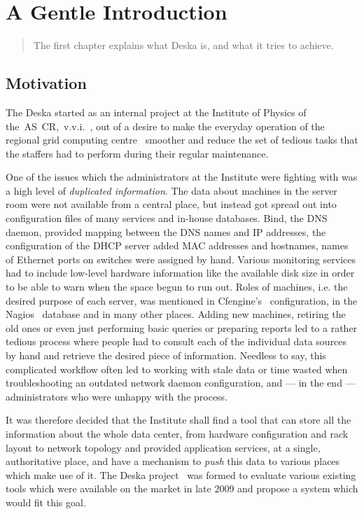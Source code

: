 \documentclass[deska]{subfiles}
\begin{document}
\chapter{A Gentle Introduction}

\begin{abstract}
The first chapter explains what Deska is, and what it tries to achieve.
\end{abstract}

\section{Motivation}

The Deska started as an internal project at the Institute of Physics of the~AS~CR,~v.v.i.~\cite{fzu}, out of a desire to make the
everyday operation of the regional grid computing centre~\cite{farm} smoother and reduce the set of tedious tasks that the staffers
had to perform during their regular maintenance.

One of the issues which the administrators at the Institute were fighting with was a high level of {\em duplicated
information}.  The data about machines in the server room were not available from a central place, but instead got
spread out into configuration files of many services and in-house databases.  Bind, the DNS daemon, provided mapping
between the DNS names and IP addresses, the configuration of the DHCP server added MAC addresses and hostnames, names of
Ethernet ports on switches were assigned by hand.  Various monitoring services had to include low-level hardware
information like the available disk size in order to be able to warn when the space begun to run out.  Roles of
machines, i.e. the desired purpose of each server, was mentioned in Cfengine's~\cite{cfengine} configuration, in the
Nagios~\cite{nagios} database and in many other places.  Adding new machines, retiring the old ones or even just
performing basic queries or preparing reports led to a rather tedious process where people had to consult each of the
individual data sources by hand and retrieve the desired piece of information.  Needless to say, this complicated
workflow often led to working with stale data or time wasted when troubleshooting an outdated network daemon
configuration, and --- in the end --- administrators who were unhappy with the process.

It was therefore decided that the Institute shall find a tool that can store all the information about the whole data
center, from hardware configuration and rack layout to network topology and provided application services, at a single,
authoritative place, and have a mechanism to {\em push} this data to various places which make use of it.  The Deska
project~\cite{deska-project} was formed to evaluate various existing tools which were available on the market in late
2009 and propose a system which would fit this goal.
\end{document}
